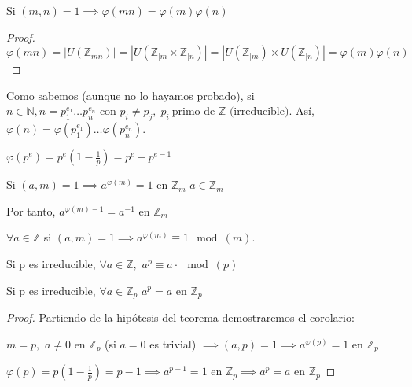 \begin{ncor}
  Si $(m,n) = 1 \implies \varphi(mn) = \varphi(m)\varphi(n)$
\end{ncor}

\begin{proof}
  $\varphi(mn) = |U(\mathbb{Z}_{mn})| = |U(\mathbb{Z}_{|m}\times\mathbb{Z}_{|n})| = |U(\mathbb{Z}_{|m}) \times U(\mathbb{Z}_{|n})| = \varphi(m)\varphi(n)$
\end{proof}
\begin{nota}
  Como sabemos (aunque no lo hayamos probado), si $n\in \mathbb{N}, n= p_1^{e_1}\dots p_n^{e_n} \text{ con } p_i \ne p_j,\; p_i\ \text{primo de $\mathbb{Z}$ (irreducible)}$. Así, $\varphi(n) = \varphi(p_1^{e_1})\dots\varphi(p_n^{e_n})$.

  $\varphi(p^e) = p^e(1-\frac{1}{p}) = p^e-p^{e-1}$
\end{nota}



\begin{nth}
	Si $(a,m)=1 \implies a^{\varphi(m)} = 1$ en $ \mathbb Z_{m}$ \hspace{0.5cm} $a \in \mathbb Z_{m} $

Por tanto, $ a^{\varphi(m)-1} = a^{-1} $ en $ \mathbb Z_{m} $

\end{nth}


\begin{nth}
	$ \forall a \in \mathbb Z $ si $(a,m) = 1 \implies a^{\varphi(m)} \equiv 1 \mod(m)$.
\end{nth}


\begin{nth}
	Si p es irreducible, $ \forall a \in \mathbb Z, $ $ a^{p} \equiv a \cdot \mod(p) $
\end{nth}



\begin{ncor}
	Si p es irreducible, $ \forall a \in \mathbb Z_{p} $	 \hspace{0.25cm} $ a^{p} = a $ en $ \mathbb Z_{p} $
\end{ncor}


\begin{proof}
	Partiendo de la hipótesis del teorema demostraremos el corolario:

$ m = p, $ $ a \neq 0 $ en  $ \mathbb Z_{p}$ (si $a=0$ es trivial) $ \implies (a,p) = 1 \implies a^{\varphi(p)} = 1 $ en $ \mathbb Z_{p} $

$ \varphi(p) = p(1-\frac{1}{p}) = p-1 \implies a^{p-1} = 1 $ en $ \mathbb Z_{p} \implies a^p=a $ en $ \mathbb Z_{p} $

\end{proof}




